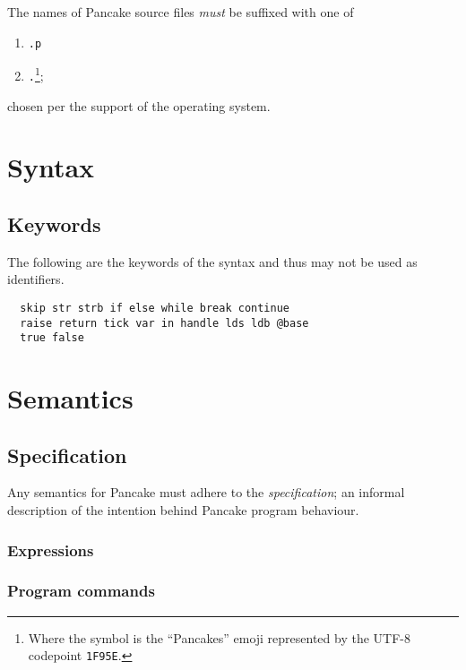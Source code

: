 \documentclass[a4paper]{amsbook}
\begin{document}
The names of Pancake source files \emph{must} be suffixed with one of
\begin{enumerate}
  \item \verb|.p|
  \item \verb|.|{\Huge{}}\footnote{Where the symbol is the ``Pancakes'' emoji represented by the UTF-8 codepoint \texttt{1F95E}.};
\end{enumerate}
chosen per the support of the operating system.

\chapter{Syntax}
\label{cha:syntax}

\section{Keywords}
\label{sec:keywords}
\lstset{language=pancakeConcrete}

The following are the keywords of the syntax and thus may not be used as identifiers.

\begin{lstlisting}
  skip str strb if else while break continue
  raise return tick var in handle lds ldb @base
  true false
\end{lstlisting}

\chapter{Semantics}
\label{cha:semantics}

\section{Specification}
\label{sec:semantics-spec}

Any semantics for Pancake must adhere to the \emph{specification}; an informal description of the intention behind Pancake program behaviour.

\subsection{Expressions}
\label{sec:expressions}

\subsection{Program commands}
\label{sec:program-commands}
\end{document}
